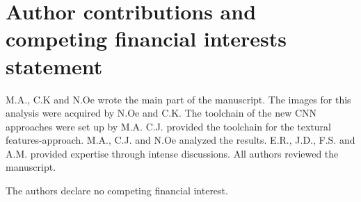 \documentclass[fleqn,10pt]{wlscirep}
\begin{document}
\section*{Author contributions and competing financial interests statement}

M.A., C.K and N.Oe wrote the main part of the manuscript.
The images for this analysis were acquired by N.Oe and C.K.
The toolchain of the new CNN approaches were set up by M.A.
C.J. provided the toolchain for the textural features-approach.
M.A., C.J. and N.Oe analyzed the results.
E.R., J.D., F.S. and A.M. provided expertise through intense discussions.
All authors reviewed the manuscript.

The authors declare no competing financial interest.
\end{document}
